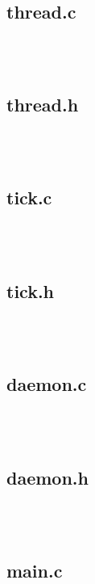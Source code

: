 \documentclass{article}
\begin{document}
\begin{verbatim}



\end{verbatim}

\subsection*{thread.c}

\begin{verbatim}



\end{verbatim}

\subsection*{thread.h}

\begin{verbatim}



\end{verbatim}

\subsection*{tick.c}

\begin{verbatim}



\end{verbatim}

\subsection*{tick.h}

\begin{verbatim}



\end{verbatim}

\subsection*{daemon.c}

\begin{verbatim}



\end{verbatim}

\subsection*{daemon.h}

\begin{verbatim}



\end{verbatim}

\subsection*{main.c}

\begin{verbatim}



\end{verbatim}
\end{document}
